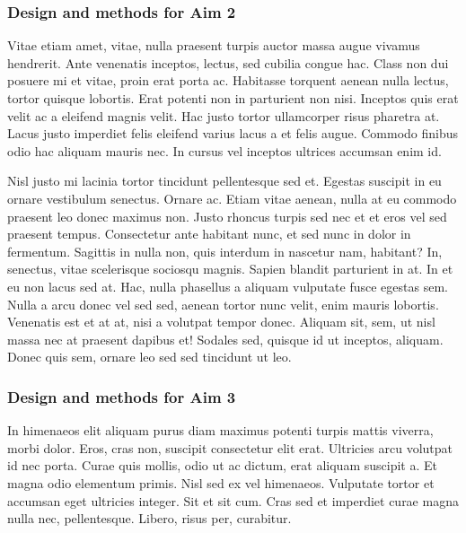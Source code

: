 \documentclass[11pt,]{article}
\begin{document}
\hypertarget{design-and-methods-for-aim-2}{%
\subsubsection{Design and methods for Aim
2}\label{design-and-methods-for-aim-2}}

Vitae etiam amet, vitae, nulla praesent turpis auctor massa augue
vivamus hendrerit. Ante venenatis inceptos, lectus, sed cubilia congue
hac. Class non dui posuere mi et vitae, proin erat porta ac. Habitasse
torquent aenean nulla lectus, tortor quisque lobortis. Erat potenti non
in parturient non nisi. Inceptos quis erat velit ac a eleifend magnis
velit. Hac justo tortor ullamcorper risus pharetra at. Lacus justo
imperdiet felis eleifend varius lacus a et felis augue. Commodo finibus
odio hac aliquam mauris nec. In cursus vel inceptos ultrices accumsan
enim id.

Nisl justo mi lacinia tortor tincidunt pellentesque sed et. Egestas
suscipit in eu ornare vestibulum senectus. Ornare ac. Etiam vitae
aenean, nulla at eu commodo praesent leo donec maximus non. Justo
rhoncus turpis sed nec et et eros vel sed praesent tempus. Consectetur
ante habitant nunc, et sed nunc in dolor in fermentum. Sagittis in nulla
non, quis interdum in nascetur nam, habitant? In, senectus, vitae
scelerisque sociosqu magnis. Sapien blandit parturient in at. In et eu
non lacus sed at. Hac, nulla phasellus a aliquam vulputate fusce egestas
sem. Nulla a arcu donec vel sed sed, aenean tortor nunc velit, enim
mauris lobortis. Venenatis est et at at, nisi a volutpat tempor donec.
Aliquam sit, sem, ut nisl massa nec at praesent dapibus et! Sodales sed,
quisque id ut inceptos, aliquam. Donec quis sem, ornare leo sed sed
tincidunt ut leo.

\hypertarget{design-and-methods-for-aim-3}{%
\subsubsection{Design and methods for Aim
3}\label{design-and-methods-for-aim-3}}

In himenaeos elit aliquam purus diam maximus potenti turpis mattis
viverra, morbi dolor. Eros, cras non, suscipit consectetur elit erat.
Ultricies arcu volutpat id nec porta. Curae quis mollis, odio ut ac
dictum, erat aliquam suscipit a. Et magna odio elementum primis. Nisl
sed ex vel himenaeos. Vulputate tortor et accumsan eget ultricies
integer. Sit et sit cum. Cras sed et imperdiet curae magna nulla nec,
pellentesque. Libero, risus per, curabitur.
\end{document}
